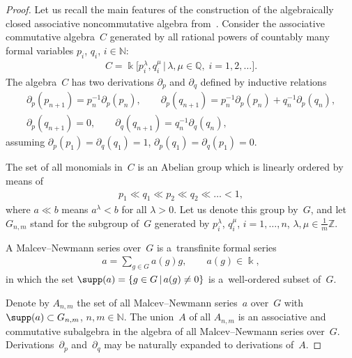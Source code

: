 \begin{proof}
Let us recall the main features of the construction of the algebraically closed associative noncommutative algebra
from~\cite{LML85}.
Consider the associative commutative algebra~$C$ generated by all rational powers of countably many formal variables
$p_i$, $q_i$, $i\in \mathbb N$:
\begin{gather*}
C = \Bbbk\big[p_i^\lambda, q_i^\mu \,\big|\, \lambda,\mu\in \mathbb Q,\; i=1,2,\dots\big].
\end{gather*}
The algebra~$C$ has two derivations $\partial_p$ and $\partial_q$ def\/ined by inductive relations
\begin{gather*}
\partial_p(p_{n+1}) = p_n^{-1}\partial_p(p_n),
\qquad
\partial_p(q_{n+1}) = p_n^{-1}\partial_p(p_n) + q_n^{-1}\partial_p(q_n),
\\
\partial_p(q_{n+1}) = 0,
\qquad
\partial_q(q_{n+1}) = q_n^{-1}\partial_q(q_n),
\end{gather*}
assuming $\partial_p(p_1)=\partial_q(q_1)=1$, $\partial_p(q_1)=\partial_q(p_1)=0$.

The set of all monomials in~$C$ is an Abelian group which is linearly ordered by means of
\begin{gather*}
p_1 \ll q_1 \ll p_2 \ll q_2 \ll \dots <1,
\end{gather*}
where $a\ll b$ means $a^\lambda <b$ for all $\lambda >0$.
Let us denote this group by~$G$, and let $G_{n,m}$ stand for the subgroup of~$G$ generated by $ p_i^\lambda $, $q_i^\mu
$, $i=1,\dots, n$, $\lambda,\mu \in \frac{1}{m}\mathbb Z$.

A Malcev--Newmann series over~$G$ is a~transf\/inite formal series
\begin{gather*}
a = \sum\limits_{g\in G} a(g) g,
\qquad
a(g)\in \Bbbk,
\end{gather*}
in which the set $\supp(a) = \{g\in G\,|\, a(g)\ne 0\}$ is a~well-ordered subset of~$G$.

Denote by $A_{n,m}$ the set of all Malcev--Newmann series~$a$ over~$G$ with $\supp(a)\subset G_{n,m}$, $n,m\in
\mathbb N$.
The union~$A$ of all $A_{n,m}$ is an associative and commutative subalgebra in the algebra of all Malcev--Newmann series
over~$G$.
Derivations~$\partial_p$ and~$\partial_q$ may be naturally expanded to derivations of~$A$.


\end{proof}
